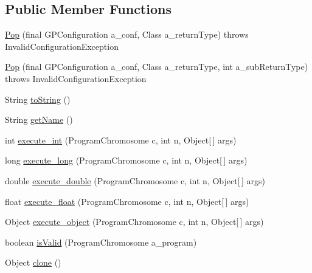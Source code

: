 \subsection*{Public Member Functions}
\begin{DoxyCompactItemize}
\item 
\hyperlink{classorg_1_1jgap_1_1gp_1_1function_1_1_pop_accf144f4544372bac441d0a2b0ea64f2}{Pop} (final G\-P\-Configuration a\-\_\-conf, Class a\-\_\-return\-Type)  throws Invalid\-Configuration\-Exception 
\item 
\hyperlink{classorg_1_1jgap_1_1gp_1_1function_1_1_pop_ae93b3380d24cae055c606d94dde962d8}{Pop} (final G\-P\-Configuration a\-\_\-conf, Class a\-\_\-return\-Type, int a\-\_\-sub\-Return\-Type)  throws Invalid\-Configuration\-Exception 
\item 
String \hyperlink{classorg_1_1jgap_1_1gp_1_1function_1_1_pop_ada93bd966ba8e709dd856acac5fde23f}{to\-String} ()
\item 
String \hyperlink{classorg_1_1jgap_1_1gp_1_1function_1_1_pop_a6ab8a18519ef7dbe79b26deddf81ccb2}{get\-Name} ()
\item 
int \hyperlink{classorg_1_1jgap_1_1gp_1_1function_1_1_pop_ab81e6337888b1bd9b1b89171811d7833}{execute\-\_\-int} (Program\-Chromosome c, int n, Object\mbox{[}$\,$\mbox{]} args)
\item 
long \hyperlink{classorg_1_1jgap_1_1gp_1_1function_1_1_pop_a9adf926a5377dfc10853fbe12991d2fa}{execute\-\_\-long} (Program\-Chromosome c, int n, Object\mbox{[}$\,$\mbox{]} args)
\item 
double \hyperlink{classorg_1_1jgap_1_1gp_1_1function_1_1_pop_aa4fd8eebac244f561298aaeaec8beee1}{execute\-\_\-double} (Program\-Chromosome c, int n, Object\mbox{[}$\,$\mbox{]} args)
\item 
float \hyperlink{classorg_1_1jgap_1_1gp_1_1function_1_1_pop_a5677cb20bec81294ec59b88b41e0df96}{execute\-\_\-float} (Program\-Chromosome c, int n, Object\mbox{[}$\,$\mbox{]} args)
\item 
Object \hyperlink{classorg_1_1jgap_1_1gp_1_1function_1_1_pop_a5de9a792628b1df3d40db019016922ad}{execute\-\_\-object} (Program\-Chromosome c, int n, Object\mbox{[}$\,$\mbox{]} args)
\item 
boolean \hyperlink{classorg_1_1jgap_1_1gp_1_1function_1_1_pop_a3b508dae374710bfdd93f16a75963c25}{is\-Valid} (Program\-Chromosome a\-\_\-program)
\item 
Object \hyperlink{classorg_1_1jgap_1_1gp_1_1function_1_1_pop_a27a9599099a5bb314a81e995f9b2d726}{clone} ()
\end{DoxyCompactItemize}
